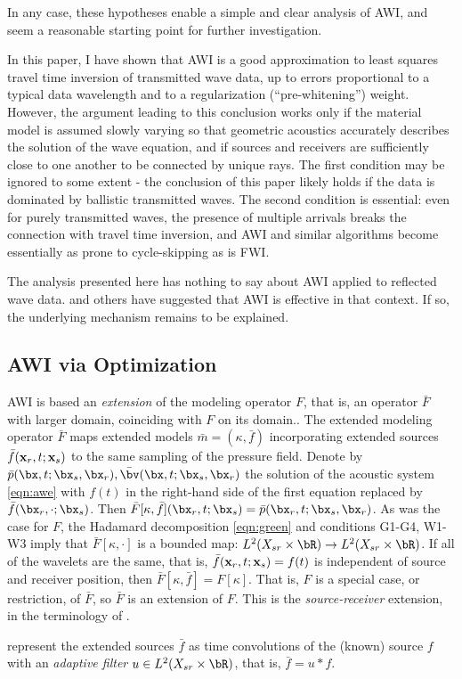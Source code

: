 In any case, these hypotheses enable a simple and clear
analysis of AWI, and seem a reasonable starting point for further
investigation.

In this paper, I have shown that AWI is a good approximation to least
squares travel time inversion of transmitted wave data, up to errors proportional to a typical
data wavelength and to a regularization (``pre-whitening'')
weight. However, the argument leading to this conclusion works only if
the material model is assumed slowly varying so that geometric
acoustics accurately describes the solution of the wave equation, and if
sources and receivers are sufficiently close to one another to be
connected by unique rays. The first condition may be ignored to some
extent - the conclusion of this paper likely holds if the data is
dominated by ballistic transmitted waves. The second condition
is essential: even for purely transmitted waves, the presence of
multiple arrivals breaks the connection
with travel time inversion, and AWI and similar algorithms
become essentially as prone to cycle-skipping as is FWI.


The analysis presented here has nothing to say about AWI applied to
reflected wave data. \cite{Warner:16} and others have
suggested that AWI is effective in that context. If so, the underlying
mechanism remains to be explained.


\subsection{AWI via Optimization}

AWI is based an {\em extension} of the modeling operator $F$, that is,
an operator ${\bar F}$ with larger domain, coinciding with $F$ on its domain..
The extended modeling operator ${\bar F}$ maps extended models
$\bar{m}=(\kappa,\bar{f})$ incorporating extended sources
$\bar{f}({\bf x}_r,t;{\bf x}_s)$ to the same sampling of the pressure
field. Denote by $\bar{p}(\bx,t;\bx_s,\bx_r), \bar{\bv}(\bx,t;\bx_s,\bx_r)$
the solution of the acoustic system \ref{eqn:awe} with $f(t)$ in the
right-hand side of the first equation replaced by
$\bar{f}(\bx_r,\cdot;\bx_s)$. Then
$\bar{F}[\kappa,\bar{f}](\bx_r,t;\bx_s) =
\bar{p}(\bx_r,t;\bx_s,\bx_r)$. As was the case for $F$, the Hadamard
decomposition \ref{eqn:green} and conditions G1-G4, W1-W3 imply that
$\bar{F}[\kappa, \cdot]$ is a bounded map: $L^2(X_{sr} \times \bR)
\rightarrow L^2(X_{sr} \times \bR)$. If all  
of the wavelets are the same, that is, ${\bar f}({\bf  
  x}_r,t;{\bf x}_s) = f(t)$ is independent of source and receiver  
position, then ${\bar F}[\kappa,\bar{f}] = F[\kappa]$. That is, $F$ is a special
case, or restriction, of ${\bar F}$, so ${\bar F}$ is an extension of
$F$. This is the {\em source-receiver} extension, in the terminology of \cite{HuangSymes2015SEG}.

\cite{Warner:16} represent the extended sources $\bar{f}$ as time convolutions of the
(known) source $f$ with an {\em adaptive filter} $u \in L^2(X_{sr}
\times \bR)$, that is, $\bar{f}=u * f$.






